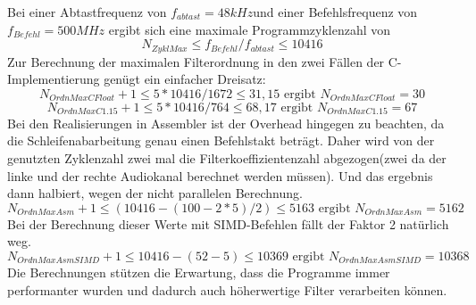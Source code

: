 Bei einer Abtastfrequenz von \( f_{abtast}=48kHz \)und einer Befehlsfrequenz von \( f_{Befehl}=500MHz \) ergibt sich eine maximale Programmzyklenzahl von
\begin{equation}
N_{ZyklMax} \leq f_{Befehl}/f_{abtast} \leq 10416 
\end{equation}
Zur Berechnung der maximalen Filterordnung in den zwei F\"allen der C-Implementierung gen\"ugt ein einfacher Dreisatz:
\begin{equation}
N_{OrdnMaxCFloat} + 1 \leq 5*10416/1672\leq 31,15 \text{ ergibt }  N_{OrdnMaxCFloat}=30
\end{equation}
\begin{equation}
N_{OrdnMaxC1.15} + 1 \leq 5*10416/764\leq 68,17 \text{ ergibt }  N_{OrdnMaxC1.15}=67
\end{equation}
Bei den Realisierungen in Assembler ist der Overhead hingegen zu beachten, da die Schleifenabarbeitung genau einen Befehlstakt betr\"agt. Daher wird von der genutzten Zyklenzahl zwei mal die Filterkoeffizientenzahl abgezogen(zwei da der linke und der rechte Audiokanal berechnet werden m\"ussen). Und das ergebnis dann halbiert, wegen der nicht parallelen Berechnung.
\begin{equation}
N_{OrdnMaxAsm} + 1 \leq (10416-(100-2*5)/2)\leq 5163 \text{ ergibt }  N_{OrdnMaxAsm}=5162
\end{equation}
Bei der Berechnung dieser Werte mit SIMD-Befehlen f\"allt der Faktor 2 nat\"urlich weg.
\begin{equation}
N_{OrdnMaxAsmSIMD} + 1 \leq 10416-(52-5)\leq 10369 \text{ ergibt }  N_{OrdnMaxAsmSIMD}=10368
\end{equation}
Die Berechnungen st\"utzen die Erwartung, dass die Programme immer performanter wurden und dadurch auch h\"oherwertige Filter verarbeiten k\"onnen.